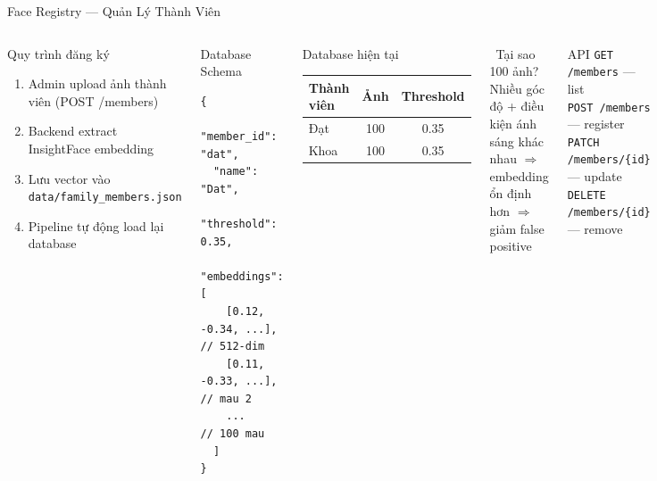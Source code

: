 \documentclass[aspectratio=169, 12pt]{beamer}
\newcommand{\filecode}[1]{\texttt{\textcolor{primary}{\small #1}}}
\begin{document}
\begin{frame}[fragile]{Face Registry --- Quản Lý Thành Viên}
\begin{columns}[T]
\begin{block}{Quy trình đăng ký}
\footnotesize
\begin{enumerate}
  \item Admin upload ảnh thành viên (POST /members)
  \item Backend extract InsightFace embedding
  \item Lưu vector vào \filecode{data/family\_members.json}
  \item Pipeline tự động load lại database
\end{enumerate}
\end{block}

\begin{block}{Database Schema}
\footnotesize
\begin{lstlisting}[numbers=none]
{
  "member_id": "dat",
  "name": "Dat",
  "threshold": 0.35,
  "embeddings": [
    [0.12, -0.34, ...],  // 512-dim
    [0.11, -0.33, ...],  // mau 2
    ...                  // 100 mau
  ]
}
\end{lstlisting}
\end{block}

\begin{block}{Database hiện tại}
\renewcommand{\arraystretch}{1.4}
\begin{tabular}{lcc}
\textbf{Thành viên} & \textbf{Ảnh} & \textbf{Threshold} \\
\hline
Đạt & 100 & 0.35 \\
Khoa & 100 & 0.35 \\
\end{tabular}
\end{block}

\begin{alertblock}{\faLightbulb\ Tại sao 100 ảnh?}
\footnotesize
Nhiều góc độ + điều kiện ánh sáng khác nhau
$\Rightarrow$ embedding ổn định hơn
$\Rightarrow$ giảm false positive
\end{alertblock}

\begin{block}{API}
\footnotesize
\texttt{GET /members} --- list\\
\texttt{POST /members} --- register\\
\texttt{PATCH /members/\{id\}} --- update\\
\texttt{DELETE /members/\{id\}} --- remove
\end{block}

\end{columns}
\end{frame}
\end{document}

